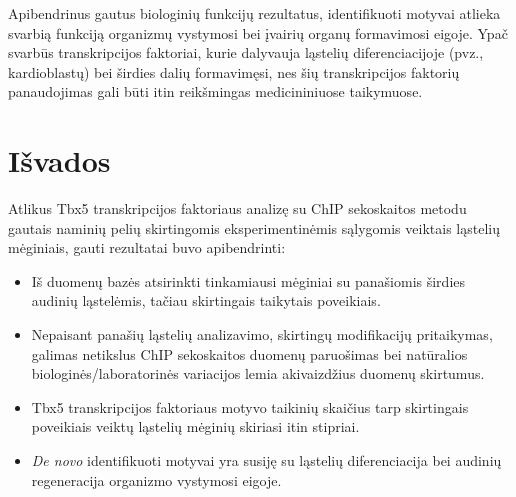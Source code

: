 \documentclass[12pt]{article}
\begin{document}
Apibendrinus gautus biologinių funkcijų rezultatus, identifikuoti motyvai
atlieka svarbią funkciją organizmų vystymosi bei įvairių organų formavimosi
eigoje. Ypač svarbūs transkripcijos faktoriai, kurie dalyvauja ląstelių
diferenciacijoje (pvz., kardioblastų) bei širdies dalių formavimęsi, nes šių
transkripcijos faktorių panaudojimas gali būti itin reikšmingas
medicininiuose taikymuose.

\newpage


\section{Išvados}
Atlikus Tbx5 transkripcijos faktoriaus analizę su ChIP sekoskaitos
metodu gautais naminių pelių skirtingomis eksperimentinėmis sąlygomis veiktais
ląstelių mėginiais, gauti rezultatai buvo apibendrinti:

\begin{itemize}
    \item Iš duomenų bazės atsirinkti tinkamiausi mėginiai su panašiomis
        širdies audinių ląstelėmis, tačiau skirtingais taikytais poveikiais.
    \item Nepaisant panašių ląstelių analizavimo, skirtingų modifikacijų
        pritaikymas, galimas netikslus ChIP sekoskaitos duomenų paruošimas
        bei natūralios biologinės/laboratorinės variacijos lemia akivaizdžius
        duomenų skirtumus.
    \item Tbx5 transkripcijos faktoriaus motyvo taikinių skaičius tarp
        skirtingais poveikiais veiktų ląstelių mėginių skiriasi itin stipriai.
    \item \emph{De novo} identifikuoti motyvai yra susiję su ląstelių
        diferenciacija bei audinių regeneracija organizmo vystymosi eigoje.
\end{itemize}

\newpage

\end{document}
